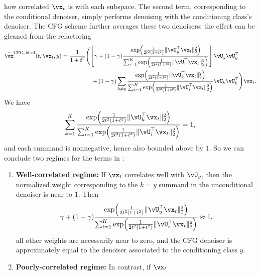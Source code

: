 \documentclass[../../book-main.tex]{subfiles}
\begin{document}
\begin{example}
  how correlated $\vx_t$ is with each subspace. The second term, corresponding to
  the conditional denoiser, simply performs denoising with the conditioning
  class's denoiser. The CFG scheme further averages these two denoisers:
  the effect can be gleaned from the refactoring
  \begin{equation}\label{eq:cfg-denoiser-mog-low-rank-2}
    \begin{split}
      \bar{\vx}^{\mathrm{CFG,\,ideal}}(t, \vx_t, y)
      =
      \frac{1}{1 + t^{2}}
      &\Biggl(
      \left[\gamma + (1 - \gamma) 
      \frac{\exp\rp{\frac{1}{2t^{2}(1
      + t^{2})}\norm{\vU_{y}^{\top}\vx_t}_{2}^{2}}}{\sum_{i
      = 1}^{K}\exp\rp{\frac{1}{2t^{2}(1
      + t^{2})}\norm{\vU_{i}^{\top}\vx_t}_{2}^{2}}}
      \right]
      \vU_{y}\vU_{y}^{\top}
      \\
      &\quad+
      (1 - \gamma) 
      \sum_{k \neq y}\frac{\exp\rp{\frac{1}{2t^{2}(1
      + t^{2})}\norm{\vU_{k}^{\top}\vx_t}_{2}^{2}}}{\sum_{i
      = 1}^{K}\exp\rp{\frac{1}{2t^{2}(1
      + t^{2})}\norm{\vU_{i}^{\top}\vx_t}_{2}^{2}}}\vU_{k}\vU_{k}^{\top}
      \Biggr)
      \vx_t.
    \end{split}
  \end{equation}
  We have
  \begin{equation}
    \sum_{k=1}^K
    \frac{\exp\rp{\frac{1}{2t^{2}(1
    + t^{2})}\norm{\vU_{k}^{\top}\vx_t}_{2}^{2}}}{\sum_{i
    = 1}^{K}\exp\rp{\frac{1}{2t^{2}(1
    + t^{2})}\norm{\vU_{i}^{\top}\vx_t}_{2}^{2}}}
    = 1,
  \end{equation}
  and each summand is nonnegative, hence also bounded above by $1$.
  So we can conclude two regimes for the terms in
  : 
  \begin{enumerate}
    \item \textbf{Well-correlated regime:} If $\vx_t$ correlates well with
      $\vU_y$, then the normalized weight corresponding to the $k=y$ summand in
      the unconditional denoiser is near to $1$. 
      Then 
      \begin{equation}
        \gamma + (1 - \gamma) 
      \frac{\exp\rp{\frac{1}{2t^{2}(1
      + t^{2})}\norm{\vU_{y}^{\top}\vx_t}_{2}^{2}}}{\sum_{i
      = 1}^{K}\exp\rp{\frac{1}{2t^{2}(1
      + t^{2})}\norm{\vU_{i}^{\top}\vx_t}_{2}^{2}}}
        \approx 1,
      \end{equation}
      all other weights are necessarily near to zero, and the CFG denoiser
      is approximately equal to the denoiser associated to the conditioning
      class $y$.
    \item \textbf{Poorly-correlated regime:} In contrast, if $\vx_t$

\end{enumerate}
\end{example}
\end{document}
